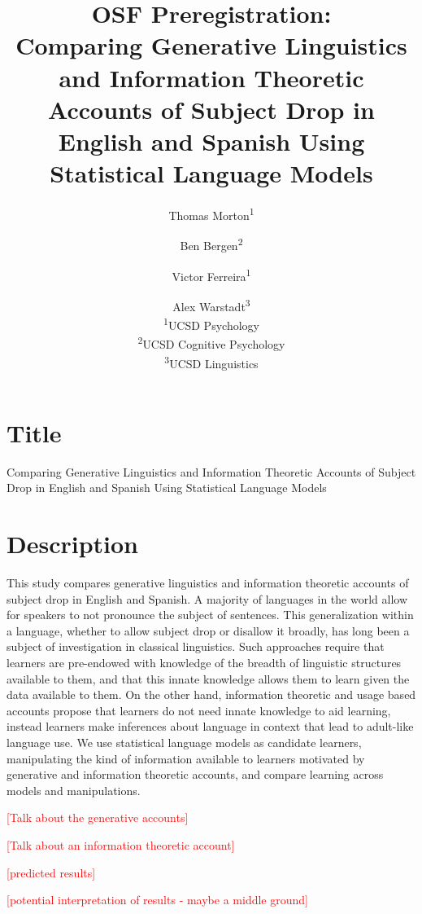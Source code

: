 \documentclass[12pt]{article}
\title{OSF Preregistration:\\
Comparing Generative Linguistics and Information Theoretic Accounts of Subject Drop in English and Spanish Using Statistical Language Models}
\author{
Thomas Morton\textsuperscript{1} \and
Ben Bergen\textsuperscript{2} \and
Victor Ferreira\textsuperscript{1} \and
Alex Warstadt\textsuperscript{3}\\[1em]
\textsuperscript{1}UCSD Psychology\\
\textsuperscript{2}UCSD Cognitive Psychology\\
\textsuperscript{3}UCSD Linguistics
}
\date{}
\begin{document}
\maketitle

\tableofcontents
\newpage

\section{Title}

Comparing Generative Linguistics and Information Theoretic Accounts of Subject Drop in English and Spanish Using Statistical Language Models

\section{Description}

This study compares generative linguistics and information theoretic accounts of subject drop in English and Spanish. A majority of languages in the world allow for speakers to not pronounce the subject of sentences. This generalization within a language, whether to allow subject drop or disallow it broadly, has long been a subject of investigation in classical linguistics. Such approaches require that learners are pre-endowed with knowledge of the breadth of linguistic structures available to them, and that this innate knowledge allows them to learn given the data available to them. On the other hand, information theoretic and usage based accounts propose that learners do not need innate knowledge to aid learning, instead learners make inferences about language in context that lead to adult-like language use. We use statistical language models as candidate learners, manipulating the kind of information available to learners motivated by generative and information theoretic accounts, and compare learning across models and manipulations.

\textcolor{red}{[Talk about the generative accounts]}

\textcolor{red}{[Talk about an information theoretic account]}

\textcolor{red}{[predicted results]}

\textcolor{red}{[potential interpretation of results - maybe a middle ground]}
\end{document}
